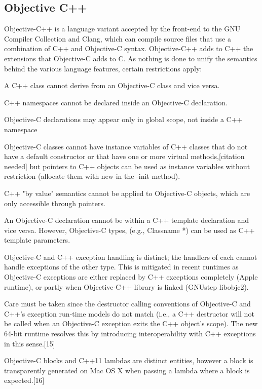 



\newpage
\subsection{Objective C++}
Objective-C++ is a language variant accepted by the front-end to the GNU Compiler Collection and Clang, which can compile source files that use a combination of C++ and Objective-C syntax. Objective-C++ adds to C++ the extensions that Objective-C adds to C. As nothing is done to unify the semantics behind the various language features, certain restrictions apply:

A C++ class cannot derive from an Objective-C class and vice versa.

C++ namespaces cannot be declared inside an Objective-C declaration.

Objective-C declarations may appear only in global scope, not inside a C++ namespace

Objective-C classes cannot have instance variables of C++ classes that do not have a default constructor or that have one or more virtual methods,[citation needed] but pointers to C++ objects can be used as instance variables without restriction (allocate them with new in the -init method).

C++ "by value" semantics cannot be applied to Objective-C objects, which are only accessible through pointers.

An Objective-C declaration cannot be within a C++ template declaration and vice versa. However, Objective-C types, (e.g., Classname *) can be used as C++ template parameters.

Objective-C and C++ exception handling is distinct; the handlers of each cannot handle exceptions of the other type. This is mitigated in recent runtimes as Objective-C exceptions are either replaced by C++ exceptions completely (Apple runtime), or partly when Objective-C++ library is linked (GNUstep libobjc2).

Care must be taken since the destructor calling conventions of Objective-C and C++’s exception run-time models do not match (i.e., a C++ destructor will not be called when an Objective-C exception exits the C++ object’s scope). The new 64-bit runtime resolves this by introducing interoperability with C++ exceptions in this sense.[15]

Objective-C blocks and C++11 lambdas are distinct entities, however a block is transparently generated on Mac OS X when passing a lambda where a block is expected.[16]

